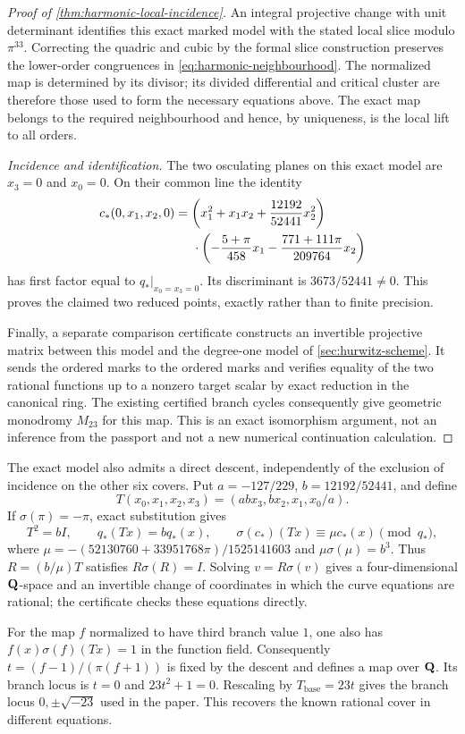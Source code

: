 \begin{proof}[Proof of \cref{thm:harmonic-local-incidence}]
An integral projective change with unit determinant identifies
this exact marked model with the stated local slice modulo
$\pi^{33}$.  Correcting the quadric and cubic by the formal slice
construction preserves the lower-order congruences in
\cref{eq:harmonic-neighbourhood}.  The normalized map is determined
by its divisor; its divided differential and critical cluster are
therefore those used to form the necessary equations above.
The exact map belongs to the required neighbourhood and hence,
by uniqueness, is the local lift to all orders.

\emph{Incidence and identification.}
The two osculating planes on this exact model are $x_3=0$ and
$x_0=0$.  On their common line the identity
\begin{align*}
 c_*(0,x_1,x_2,0)
 &=\left(x_1^2+x_1x_2+\frac{12192}{52441}x_2^2\right)\\
 &\hspace{5mm}\cdot
 \left(-\frac{5+\pi}{458}x_1
             -\frac{771+111\pi}{209764}x_2\right)
\end{align*}
has first factor equal to $q_*|_{x_0=x_3=0}$.
Its discriminant is $3673/52441\ne0$.  This proves the claimed
two reduced points, exactly rather than to finite precision.

Finally, a separate comparison certificate constructs an invertible
projective matrix between this model and the degree-one model of
\cref{sec:hurwitz-scheme}.  It sends the ordered marks to the
ordered marks and verifies equality of the two rational functions
up to a nonzero target scalar by exact reduction in the canonical
ring.  The existing certified branch cycles consequently give
geometric monodromy $M_{23}$ for this map.  This is an exact
isomorphism argument, not an inference from the passport and not
a new numerical continuation calculation.
\end{proof}

\begin{remark}
The exact model also admits a direct descent, independently of
the exclusion of incidence on the other six covers.
Put $a=-127/229$, $b=12192/52441$, and define
\[
 T(x_0,x_1,x_2,x_3)=(abx_3,bx_2,x_1,x_0/a).
\]
If $\sigma(\pi)=-\pi$, exact substitution gives
\[
 T^2=bI,\qquad q_*(Tx)=bq_*(x),\qquad
 \sigma(c_*)(Tx)\equiv\mu c_*(x)\pmod{q_*},
\]
where $\mu=-(52130760+33951768\pi)/1525141603$ and
$\mu\sigma(\mu)=b^3$.
Thus $R=(b/\mu)T$ satisfies $R\sigma(R)=I$.
Solving $v=R\sigma(v)$ gives a four-dimensional $\mathbf Q$-space
and an invertible change of coordinates in which the curve
equations are rational; the certificate checks these equations
directly.

For the map $f$ normalized to have third branch value $1$, one also
has $f(x)\sigma(f)(Tx)=1$ in the function field.
Consequently $t=(f-1)/(\pi(f+1))$ is fixed by the descent and
defines a map over $\mathbf Q$.  Its branch locus is $t=0$ and
$23t^2+1=0$.  Rescaling by $T_{\mathrm{base}}=23t$ gives the
branch locus $0,\pm\sqrt{-23}$ used in the paper.
This recovers the known rational cover in different equations.
\end{remark}

